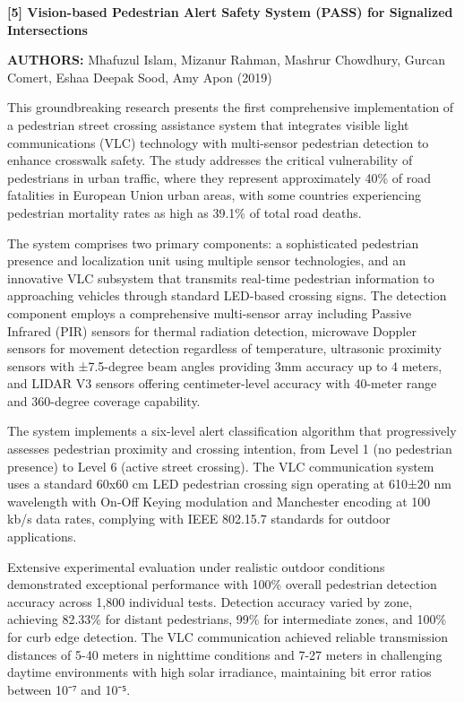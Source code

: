 \documentclass[a4paper, 12pt]{report}
\begin{document}
\noindent \textbf{[5] Vision-based Pedestrian Alert Safety System (PASS) for Signalized Intersections}

\textbf{AUTHORS:} Mhafuzul Islam, Mizanur Rahman, Mashrur Chowdhury, Gurcan Comert, Eshaa Deepak Sood, Amy Apon (2019)


This groundbreaking research presents the first comprehensive implementation of a pedestrian street crossing assistance system that integrates visible light communications (VLC) technology with multi-sensor pedestrian detection to enhance crosswalk safety. The study addresses the critical vulnerability of pedestrians in urban traffic, where they represent approximately 40\% of road fatalities in European Union urban areas, with some countries experiencing pedestrian mortality rates as high as 39.1\% of total road deaths.

The system comprises two primary components: a sophisticated pedestrian presence and localization unit using multiple sensor technologies, and an innovative VLC subsystem that transmits real-time pedestrian information to approaching vehicles through standard LED-based crossing signs. The detection component employs a comprehensive multi-sensor array including Passive Infrared (PIR) sensors for thermal radiation detection, microwave Doppler sensors for movement detection regardless of temperature, ultrasonic proximity sensors with ±7.5-degree beam angles providing 3mm accuracy up to 4 meters, and LIDAR V3 sensors offering centimeter-level accuracy with 40-meter range and 360-degree coverage capability.

The system implements a six-level alert classification algorithm that progressively assesses pedestrian proximity and crossing intention, from Level 1 (no pedestrian presence) to Level 6 (active street crossing). The VLC communication system uses a standard 60x60 cm LED pedestrian crossing sign operating at 610±20 nm wavelength with On-Off Keying modulation and Manchester encoding at 100 kb/s data rates, complying with IEEE 802.15.7 standards for outdoor applications.

Extensive experimental evaluation under realistic outdoor conditions demonstrated exceptional performance with 100\% overall pedestrian detection accuracy across 1,800 individual tests. Detection accuracy varied by zone, achieving 82.33\% for distant pedestrians, 99\% for intermediate zones, and 100\% for curb edge detection. The VLC communication achieved reliable transmission distances of 5-40 meters in nighttime conditions and 7-27 meters in challenging daytime environments with high solar irradiance, maintaining bit error ratios between 10⁻⁷ and 10⁻⁵.
\end{document}
